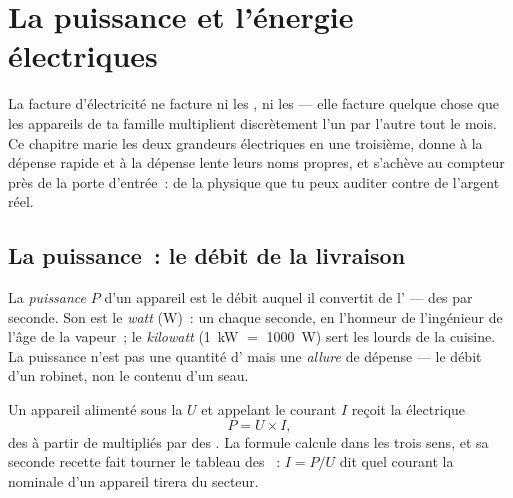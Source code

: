 \chapter{La puissance et l'énergie électriques}\label{ch:g9:electric-power-energy}

La facture d'électricité ne facture ni les , ni les  ---
elle facture quelque chose que les appareils de ta famille multiplient
discrètement l'un par l'autre tout le mois. Ce chapitre marie les deux
grandeurs électriques en une troisième, donne à la dépense rapide et à
la dépense lente leurs noms propres, et s'achève au compteur près de
la porte d'entrée~: de la physique que tu peux auditer contre de
l'argent réel.

\section{La puissance~: le débit de la livraison}

\begin{definition}\label{def:g9:electric-power-energy:power}
La \emph{puissance} $P$ d'un appareil est le débit
auquel il convertit de l' --- des  par seconde. Son 
est le \emph{watt} (\unit{W})~: un  chaque seconde,
en l'honneur de l'ingénieur de l'âge de la vapeur~; le
\emph{kilowatt} (\qty{1}{kW} $=$ \qty{1000}{W}) sert les  lourds
de la cuisine. La puissance n'est pas une quantité d' mais une
\emph{allure} de dépense --- le débit d'un robinet, non le contenu
d'un seau.
\end{definition}

\begin{proposition}\label{prop:g9:electric-power-energy:UI}
Un appareil alimenté sous la  $U$ et appelant le courant $I$
reçoit la  électrique
\[
P = U \times I ,
\]
des  à partir de  multipliés par des . La formule
calcule dans les trois sens, et sa seconde recette fait tourner le
tableau des ~: $I = P/U$ dit quel courant la 
nominale d'un appareil tirera du secteur.
\end{proposition}

